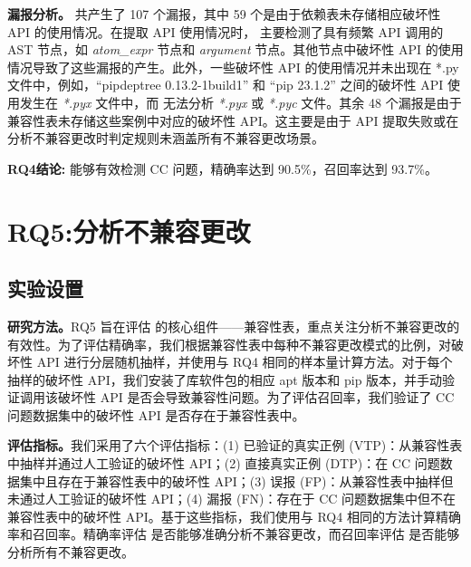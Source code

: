 \textbf{漏报分析。}\tool{} 共产生了 107 个漏报，其中 59 个是由于依赖表未存储相应破坏性 API 的使用情况。在提取 API 使用情况时，\tool{} 主要检测了具有频繁 API 调用的 AST 节点，如 \textit{atom\_expr} 节点和 \textit{argument} 节点。其他节点中破坏性 API 的使用情况导致了这些漏报的产生。此外，一些破坏性 API 的使用情况并未出现在 *.py 文件中，例如，“pipdeptree 0.13.2-1build1”  和 “pip 23.1.2”  之间的破坏性 API 使用发生在 \textit{*.pyx} 文件中，而 \tool{} 无法分析 \textit{*.pyx} 或 \textit{*.pyc} 文件。其余 48 个漏报是由于兼容性表未存储这些案例中对应的破坏性 API。这主要是由于 API 提取失败或在分析不兼容更改时判定规则未涵盖所有不兼容更改场景。

\begin{tcolorbox}[boxrule=1pt,boxsep=1pt,left=2pt,right=2pt,top=2pt,bottom=2pt]
	\small
	\textcolor{red}{} \noindent\textbf{RQ4结论:} 
	\tool{} 能够有效检测 CC 问题，精确率达到 90.5\%，召回率达到 93.7\%。
\end{tcolorbox} 

\section{RQ5:分析不兼容更改}
\subsection{实验设置}
\textbf{研究方法。}RQ5 旨在评估 \tool{} 的核心组件——兼容性表，重点关注分析不兼容更改的有效性。为了评估精确率，我们根据兼容性表中每种不兼容更改模式的比例，对破坏性 API 进行分层随机抽样，并使用与 RQ4 相同的样本量计算方法。对于每个抽样的破坏性 API，我们安装了库软件包的相应 apt 版本和 pip 版本，并手动验证调用该破坏性 API 是否会导致兼容性问题。为了评估召回率，我们验证了 CC 问题数据集中的破坏性 API 是否存在于兼容性表中。

\textbf{评估指标。}我们采用了六个评估指标：(1) 已验证的真实正例 (VTP)：从兼容性表中抽样并通过人工验证的破坏性 API；(2) 直接真实正例 (DTP)：在 CC 问题数据集中且存在于兼容性表中的破坏性 API；(3) 误报 (FP)：从兼容性表中抽样但未通过人工验证的破坏性 API；(4) 漏报 (FN)：存在于 CC 问题数据集中但不在兼容性表中的破坏性 API。基于这些指标，我们使用与 RQ4 相同的方法计算精确率和召回率。精确率评估 \tool{} 是否能够准确分析不兼容更改，而召回率评估 \tool{} 是否能够分析所有不兼容更改。
